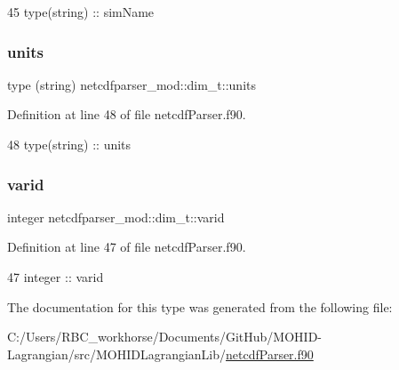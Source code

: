\begin{DoxyCode}
45         \textcolor{keywordtype}{type}(string) :: simName
\end{DoxyCode}
\mbox{\label{structnetcdfparser__mod_1_1dim__t_a42d4e5dd93905b5b6912dd7675d0e1db}} 
\subsubsection{\texorpdfstring{units}{units}}
{\footnotesize\ttfamily type (string) netcdfparser\+\_\+mod\+::dim\+\_\+t\+::units\hspace{0.3cm}{\ttfamily [private]}}



Definition at line 48 of file netcdf\+Parser.\+f90.


\begin{DoxyCode}
48         type(string) :: units
\end{DoxyCode}
\mbox{\label{structnetcdfparser__mod_1_1dim__t_a850c5b53b1fa2c09e19ee37896065897}} 
\subsubsection{\texorpdfstring{varid}{varid}}
{\footnotesize\ttfamily integer netcdfparser\+\_\+mod\+::dim\+\_\+t\+::varid\hspace{0.3cm}{\ttfamily [private]}}



Definition at line 47 of file netcdf\+Parser.\+f90.


\begin{DoxyCode}
47         \textcolor{keywordtype}{integer} :: varid
\end{DoxyCode}


The documentation for this type was generated from the following file\+:\begin{DoxyCompactItemize}
\item 
C\+:/\+Users/\+R\+B\+C\+\_\+workhorse/\+Documents/\+Git\+Hub/\+M\+O\+H\+I\+D-\/\+Lagrangian/src/\+M\+O\+H\+I\+D\+Lagrangian\+Lib/\mbox{\hyperlink{netcdf_parser_8f90}{netcdf\+Parser.\+f90}}\end{DoxyCompactItemize}
